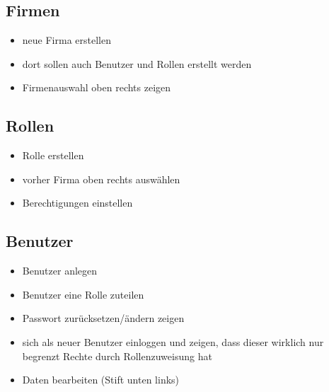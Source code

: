 \documentclass[12pt,a4paper]{report}
\begin{document}
	\subsection*{Firmen}
		\begin{itemize}
			\item neue Firma erstellen
			\item dort sollen auch Benutzer und Rollen erstellt werden
			\item Firmenauswahl oben rechts zeigen
		\end{itemize}

	\subsection*{Rollen}
		\begin{itemize}
			\item Rolle erstellen
			\item vorher Firma oben rechts auswählen
			\item Berechtigungen einstellen 
		\end{itemize}
	
	\subsection*{Benutzer}
		\begin{itemize}
			\item Benutzer anlegen
			\item Benutzer eine Rolle zuteilen
			\item Passwort zurücksetzen/ändern zeigen
			\item sich als neuer Benutzer einloggen und zeigen, dass dieser wirklich nur begrenzt Rechte durch Rollenzuweisung hat
			\item Daten bearbeiten (Stift unten links)
		\end{itemize}
	\clearpage
\end{document}
